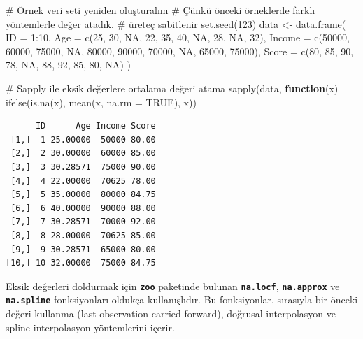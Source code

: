\documentclass[
  letterpaper,
  DIV=11,
  numbers=noendperiod]{scrreprt}
\newenvironment{Shaded}{\begin{snugshade}}{\end{snugshade}}
\newcommand{\AttributeTok}[1]{\textcolor[rgb]{0.40,0.45,0.13}{#1}}
\newcommand{\CommentTok}[1]{\textcolor[rgb]{0.37,0.37,0.37}{#1}}
\newcommand{\ConstantTok}[1]{\textcolor[rgb]{0.56,0.35,0.01}{#1}}
\newcommand{\ControlFlowTok}[1]{\textcolor[rgb]{0.00,0.23,0.31}{\textbf{#1}}}
\newcommand{\DecValTok}[1]{\textcolor[rgb]{0.68,0.00,0.00}{#1}}
\newcommand{\FunctionTok}[1]{\textcolor[rgb]{0.28,0.35,0.67}{#1}}
\newcommand{\NormalTok}[1]{\textcolor[rgb]{0.00,0.23,0.31}{#1}}
\newcommand{\OtherTok}[1]{\textcolor[rgb]{0.00,0.23,0.31}{#1}}
\newcommand{\SpecialCharTok}[1]{\textcolor[rgb]{0.37,0.37,0.37}{#1}}
\begin{document}
\begin{Shaded}
\begin{Highlighting}[]
\CommentTok{\# Örnek veri seti yeniden oluşturalım}
\CommentTok{\# Çünkü önceki örneklerde farklı yöntemlerle değer atadık.}
\CommentTok{\# üreteç sabitlenir}
\FunctionTok{set.seed}\NormalTok{(}\DecValTok{123}\NormalTok{)}
\NormalTok{data }\OtherTok{\textless{}{-}} \FunctionTok{data.frame}\NormalTok{(}
  \AttributeTok{ID =} \DecValTok{1}\SpecialCharTok{:}\DecValTok{10}\NormalTok{,}
  \AttributeTok{Age =} \FunctionTok{c}\NormalTok{(}\DecValTok{25}\NormalTok{, }\DecValTok{30}\NormalTok{, }\ConstantTok{NA}\NormalTok{, }\DecValTok{22}\NormalTok{, }\DecValTok{35}\NormalTok{, }\DecValTok{40}\NormalTok{, }\ConstantTok{NA}\NormalTok{, }\DecValTok{28}\NormalTok{, }\ConstantTok{NA}\NormalTok{, }\DecValTok{32}\NormalTok{),}
  \AttributeTok{Income =} \FunctionTok{c}\NormalTok{(}\DecValTok{50000}\NormalTok{, }\DecValTok{60000}\NormalTok{, }\DecValTok{75000}\NormalTok{, }\ConstantTok{NA}\NormalTok{, }\DecValTok{80000}\NormalTok{, }\DecValTok{90000}\NormalTok{, }\DecValTok{70000}\NormalTok{, }\ConstantTok{NA}\NormalTok{, }\DecValTok{65000}\NormalTok{, }\DecValTok{75000}\NormalTok{),}
  \AttributeTok{Score =} \FunctionTok{c}\NormalTok{(}\DecValTok{80}\NormalTok{, }\DecValTok{85}\NormalTok{, }\DecValTok{90}\NormalTok{, }\DecValTok{78}\NormalTok{, }\ConstantTok{NA}\NormalTok{, }\DecValTok{88}\NormalTok{, }\DecValTok{92}\NormalTok{, }\DecValTok{85}\NormalTok{, }\DecValTok{80}\NormalTok{, }\ConstantTok{NA}\NormalTok{)}
\NormalTok{)}


\CommentTok{\# Sapply ile eksik değerlere ortalama değeri atama}
\FunctionTok{sapply}\NormalTok{(data, }\ControlFlowTok{function}\NormalTok{(x)}
  \FunctionTok{ifelse}\NormalTok{(}\FunctionTok{is.na}\NormalTok{(x), }\FunctionTok{mean}\NormalTok{(x, }\AttributeTok{na.rm =} \ConstantTok{TRUE}\NormalTok{), x))}
\end{Highlighting}
\end{Shaded}

\begin{verbatim}
      ID      Age Income Score
 [1,]  1 25.00000  50000 80.00
 [2,]  2 30.00000  60000 85.00
 [3,]  3 30.28571  75000 90.00
 [4,]  4 22.00000  70625 78.00
 [5,]  5 35.00000  80000 84.75
 [6,]  6 40.00000  90000 88.00
 [7,]  7 30.28571  70000 92.00
 [8,]  8 28.00000  70625 85.00
 [9,]  9 30.28571  65000 80.00
[10,] 10 32.00000  75000 84.75
\end{verbatim}

Eksik değerleri doldurmak için \textbf{\texttt{zoo}} paketinde bulunan
\textbf{\texttt{na.locf}}, \textbf{\texttt{na.approx}} ve
\textbf{\texttt{na.spline}} fonksiyonları oldukça kullanışlıdır. Bu
fonksiyonlar, sırasıyla bir önceki değeri kullanma (last observation
carried forward), doğrusal interpolasyon ve spline interpolasyon
yöntemlerini içerir.
\end{document}
